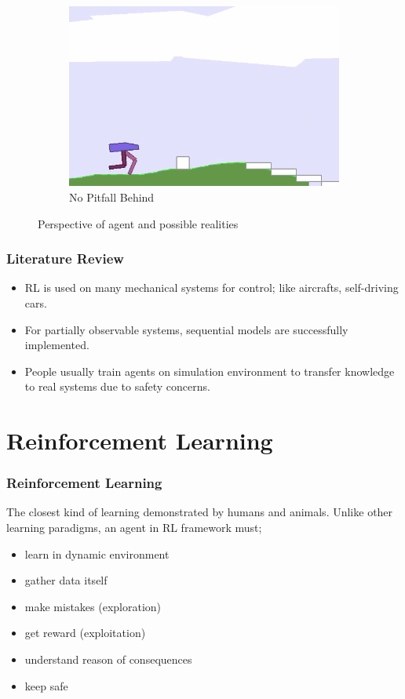\documentclass{beamer}
\begin{document}
\begin{frame}
\begin{figure}
\begin{subfigure}{.32\textwidth}
		\includegraphics[width=0.99\linewidth]{figures/bipedal/po/no_pitfall_behind.png}
		\caption{No Pitfall Behind}
		\label{fig:no_pitfall_behind}
	\end{subfigure}
	\caption{Perspective of agent and possible realities}
	\label{fig:partial_obs_pitfall}
\end{figure}
\end{frame}

\begin{frame}
\frametitle{Literature Review}
\begin{itemize}
	\item RL is used on many mechanical systems for control; like aircrafts, self-driving cars.  
	\item For partially observable systems, sequential models are successfully implemented. 
	\item People usually train agents on simulation environment to transfer knowledge to real systems due to safety concerns. 
\end{itemize}
\end{frame}


\section{Reinforcement Learning}

\begin{frame}
\frametitle{Reinforcement Learning}
The closest kind of learning demonstrated by humans and animals. 
Unlike other learning paradigms, an agent in RL framework must;
\begin{itemize}
	\item learn in dynamic environment
	\item gather data itself
	\item make mistakes (exploration)
	\item get reward (exploitation)
	\item understand reason of consequences
	\item keep safe
\end{itemize}
\end{frame}
\end{document}
